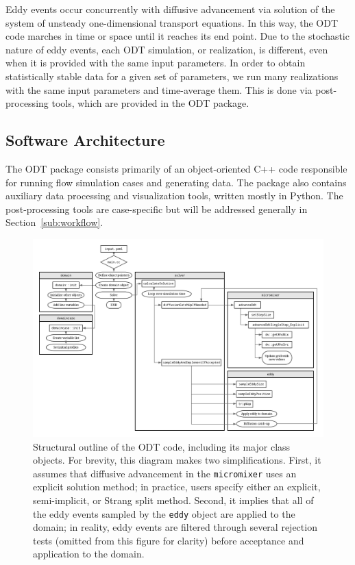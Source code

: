 \documentclass[preprint,12pt, a4paper]{elsarticle}
\begin{document}
Eddy events occur concurrently with diffusive advancement via solution of the system of unsteady one-dimensional transport equations. In this way, the ODT code marches in time or space until it reaches its end point. Due to the stochastic nature of eddy events, each ODT simulation, or realization, is different, even when it is provided with the same input parameters. In order to obtain statistically stable data for a given set of parameters, we run many realizations with the same input parameters and time-average them. This is done via post-processing tools, which are provided in the ODT package. 

\subsection{Software Architecture}
\label{sub:architecture}

The ODT package consists primarily of an object-oriented C++ code responsible for running flow simulation cases and generating data. The package also contains auxiliary data processing and visualization tools, written mostly in Python. The post-processing tools are case-specific but will be  addressed generally in Section~\ref{sub:workflow}. 

\begin{figure}
	\centering
	\includegraphics[width=\textwidth]{../figures/odt_flow_chart/odt_flow_chart.png} 
	\caption{Structural outline of the ODT code, including its major class objects. For brevity, this diagram makes two simplifications. First, it assumes that diffusive advancement in the \texttt{micromixer} uses an explicit solution method; in practice, users specify either an explicit, semi-implicit, or Strang split method. Second, it implies that all of the eddy events sampled by the \texttt{eddy} object are applied to the domain; in reality, eddy events are filtered through several rejection tests (omitted from this figure for clarity) before acceptance and application to the domain.}
	\label{fig:flowchart}
\end{figure}
\end{document}
